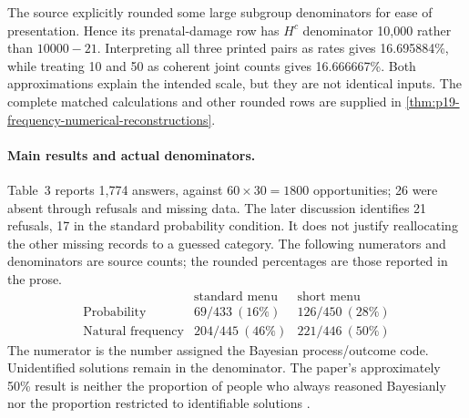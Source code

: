 The source explicitly rounded some large subgroup denominators for ease of
presentation. Hence its prenatal-damage row has \(H^c\) denominator 10,000
rather than \(10000-21\). Interpreting all three printed pairs as rates
gives 16.695884\%, while treating 10 and 50 as coherent joint counts gives
16.666667\%. Both approximations explain the intended scale, but they
are not identical inputs. The complete matched calculations and other rounded
rows are supplied in \cref{thm:p19-frequency-numerical-reconstructions}.

\paragraph{Main results and actual denominators.}
Table~3 reports 1,774 answers, against \(60\times30=1800\) opportunities;
26 were absent through refusals and missing data. The later discussion
identifies 21 refusals, 17 in the standard probability condition. It does
not justify reallocating the other missing records to a guessed category.
The following numerators and denominators are source counts; the rounded
percentages are those reported in the prose.
\[
\begin{array}{c|rr}
 &\text{standard menu}&\text{short menu}\\\hline
\text{Probability}&69/433\ (16\%)&126/450\ (28\%)\\
\text{Natural frequency}&204/445\ (46\%)&221/446\ (50\%)
\end{array}
\]
The numerator is the number assigned the Bayesian process/outcome code.
Unidentified solutions remain in the denominator. The paper's approximately
50\% result is neither the proportion of people who always reasoned
Bayesianly nor the proportion restricted to identifiable solutions
\cite[pp.~693--695, 699]{GigerenzerHoffrage1995FrequencyFormats}.

